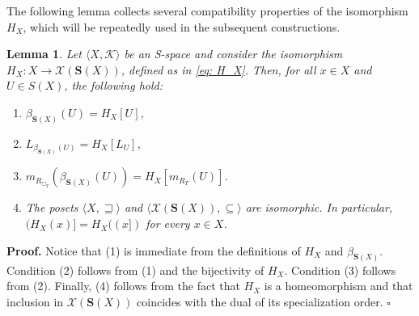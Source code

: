 \documentclass{article}
\newtheorem{lemma}{\bf Lemma}[section]
\newenvironment{proof}
{\par\noindent\textbf{Proof. }\rm}
{\hfill$\boldsymbol{\square}$\par\vspace{0.3cm}}
\begin{document}
The following lemma collects several compatibility properties of the isomorphism $H_X$, which will be repeatedly used in the subsequent constructions. 

\begin{lemma}\label{lem: cosas de H_X}
    Let $\langle X, \mathcal{K}\rangle$ be an S-space and consider the isomorphism $H_X\colon X \rightarrow \mathcal{X}(\mathbf{S}(X))$, defined as in \eqref{eq: H_X}. Then, for all $x\in X$ and $U\in S(X)$, the following hold:
    \begin{enumerate}
        \item $\beta_{\mathbf{S}(X)}(U)=H_X[U]$,
        \item $L_{\beta_{\mathbf{S}(X)}(U)}=H_{X}[L_U]$,
        \item $m_{R_{\Box_T}}(\beta_{\mathbf{S}(X)}(U))=H_X[m_{R_T}(U)]$.
        \item The posets $\langle X,\sqsupseteq\rangle$ and $\langle \mathcal{X}(\mathbf{S}(X)), \subseteq\rangle$ are isomorphic. In particular, $(H_X(x)]=H_X((x])$ for every $x \in X $. 
    \end{enumerate}
\end{lemma}
\begin{proof}
Notice that (1) is immediate from the definitions of $H_X$ and $\beta_{\mathbf{S}(X)}$. Condition (2) follows from (1) and the bijectivity of $H_X$. Condition (3) follows from (2). Finally, (4) follows from the fact that $H_X$ is a homeomorphism and that inclusion in $\mathcal{X}(\mathbf{S}(X))$ coincides with the dual of its specialization order.
\end{proof}
\end{document}

